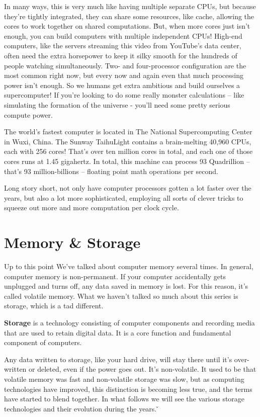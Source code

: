 In many ways, this is very much like having multiple separate CPUs, but because they're tightly integrated, they can
share some resources, like cache, allowing the cores to work together on shared computations. \v

But, when more cores just isn't enough, you can build computers with multiple independent CPUs! High-end computers,
like the servers streaming this video from YouTube's data center, often need the extra horsepower to keep it silky
smooth for the hundreds of people watching simultaneously. Two- and four-processor configuration are the most common
right now, but every now and again even that much processing power isn't enough. So we humans get extra ambitious and
build ourselves a supercomputer! If you're looking to do some really monster calculations – like simulating the
formation of the universe - you'll need some pretty serious compute power.

\be
The world's fastest computer is located in The National Supercomputing Center in Wuxi, China. The Sunway TaihuLight
contains a brain-melting 40,960 CPUs, each with 256 cores! That's over ten million cores in total, and each one of
those cores runs at 1.45 gigahertz. In total, this machine can process 93 Quadrillion -- that's 93 million-billions
-- floating point math operations per second.
\ee

Long story short, not only have computer processors gotten a lot faster over the years, but also a lot more
sophisticated, employing all sorts of clever tricks to squeeze out more and more computation per clock cycle.

\section{Memory \& Storage}

Up to this point We've talked about computer memory several times. In general, computer memory is non-permanent. If
your computer accidentally gets unplugged and turns off, any data saved in memory is lost. For this reason, it's
called volatile memory. What we haven't talked so much about this series is storage, which is a tad different.

\bd[Storage]
\textbf{Storage} is a technology consisting of computer components and recording media that are used to retain
digital data. It is a core function and fundamental component of computers.
\ed

Any data written to storage, like your hard drive, will stay there until it's over-written or deleted, even if the
power goes out. It's non-volatile. It used to be that volatile memory was fast and non-volatile storage was slow, but
as computing technologies have improved, this distinction is becoming less true, and the terms have started to blend
together. In what follows we will see the various storage technologies and their evolution during the years. \v

